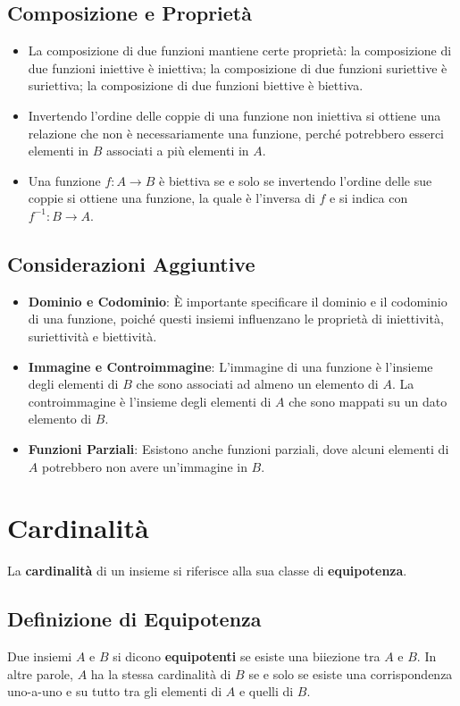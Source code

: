 \documentclass{article}
\begin{document}
\subsection{Composizione e Proprietà}
\begin{itemize}
\item La composizione di due funzioni mantiene certe proprietà: la composizione di due funzioni iniettive è iniettiva; la composizione di due funzioni suriettive è suriettiva; la composizione di due funzioni biettive è biettiva.
\item Invertendo l’ordine delle coppie di una funzione non iniettiva si ottiene una relazione che non è necessariamente una funzione, perché potrebbero esserci elementi in $B$ associati a più elementi in $A$.
\item Una funzione $f: A \to B$ è biettiva se e solo se invertendo l’ordine delle sue coppie si ottiene una funzione, la quale è l'inversa di $f$ e si indica con $f^{-1}: B \to A$.
\end{itemize}

\subsection{Considerazioni Aggiuntive}
\begin{itemize}
\item \textbf{Dominio e Codominio}: È importante specificare il dominio e il codominio di una funzione, poiché questi insiemi influenzano le proprietà di iniettività, suriettività e biettività.
\item \textbf{Immagine e Controimmagine}: L'immagine di una funzione è l'insieme degli elementi di $B$ che sono associati ad almeno un elemento di $A$. La controimmagine è l'insieme degli elementi di $A$ che sono mappati su un dato elemento di $B$.
\item \textbf{Funzioni Parziali}: Esistono anche funzioni parziali, dove alcuni elementi di $A$ potrebbero non avere un'immagine in $B$.
\end{itemize}

\newpage
\section{Cardinalità}
La \textbf{cardinalità} di un insieme si riferisce alla sua classe di \textbf{equipotenza}.

\subsection{Definizione di Equipotenza}
Due insiemi $A$ e $B$ si dicono \textbf{equipotenti} se esiste una biiezione tra $A$ e $B$. In altre parole, $A$ ha la stessa cardinalità di $B$ se e solo se esiste una corrispondenza uno-a-uno e su tutto tra gli elementi di $A$ e quelli di $B$.
\end{document}
